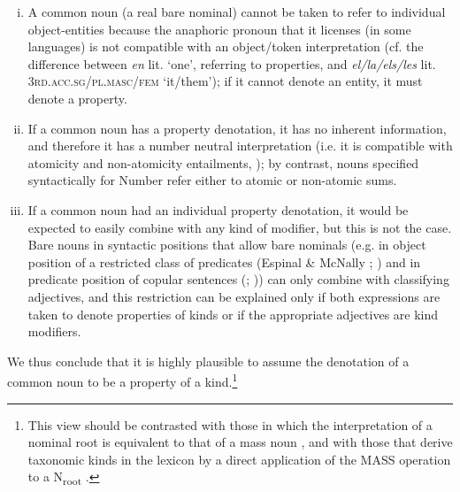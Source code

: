 \documentclass[output=paper
,modfonts
,nonflat]{langsci/langscibook}
\begin{document}
	\begin{enumerate}[(i)]
	
	\item A common noun (a real bare nominal) cannot be taken to refer to individual object-entities because the anaphoric pronoun that it licenses (in some  languages) is not compatible with an object/token interpretation (cf. the difference between  \textit{en} lit. `one', referring to properties, and \textit{el/la/els/les} lit. 3\textsc{rd.acc.sg/pl.masc/fem} `it/them'); if it cannot denote an entity, it must denote a property. 
	
	\item If a common noun has a property denotation, it has no inherent  information, and therefore it has a number neutral interpretation (i.e. it is compatible with atomicity and non-atomicity entailments, \citealt{Farkas2003}); by contrast, nouns specified syntactically for Number refer either to atomic or non-atomic sums. 
	
	\item If a common noun had an individual property denotation, it would be expected to easily combine with any kind of modifier, but this is not the case. Bare nouns in syntactic positions that allow bare nominals (e.g. in object position of a restricted class of predicates (Espinal \& McNally \citeyear{Espinal2007a}; \citeyear{Espinal2011}) and in predicate position of copular sentences (\citealt{deSwart2007}; \citealt{Zamparelli2008})) can only combine with classifying adjectives, and this restriction can be explained only if both expressions are taken to denote properties of kinds or if the appropriate adjectives are kind modifiers.
	\end{enumerate} 
	
	We thus conclude that it is highly plausible to assume the denotation of a common noun to be a property of a kind.\footnote{This view should be contrasted with those in which the interpretation of a nominal root is equivalent to that of a mass noun \citep{Borer2005,Rothstein2010}, and with those that derive taxonomic kinds in the lexicon by a direct application of the MASS operation to a N\textsubscript{root} \citep{PiresdeOliveira2011,Trugman2013}.}
	
\end{document}
